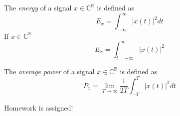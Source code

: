 \begin{definition}
    [Energy]
    The \textit{energy} of a signal $x \in \mathbb{C}^\mathbb{R}$ is defined as
    \[
        E_x = \int_{-\infty}^{\infty} |x(t)|^2 dt
    \]
    If $x \in \mathbb{C}^\mathbb{R}$
    \[
        E_x = \int_{t=-\infty}^{\infty} |x(t)|^2
    \]
\end{definition}

\begin{definition}
    The \textit{average power} of a signal $x \in \mathbb{C}^\mathbb{R}$ is defined as
    \[
        P_x = \lim_{T \to \infty} \frac{1}{2T} \int_{-T}^{T} |x(t)|^2 dt
    \]
\end{definition}



\begin{remark}
    Homework is assigned!
\end{remark}
